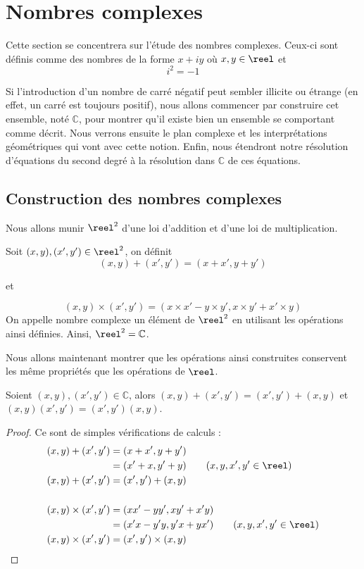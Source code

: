 \section{Nombres complexes}

Cette section se concentrera sur l'étude des nombres complexes. Ceux-ci sont définis comme des nombres de la forme $x+iy$ où $x,y\in\reel$ et $$i^2=-1$$

Si l'introduction d'un nombre de carré négatif peut sembler illicite ou étrange (en effet, un carré est toujours positif), nous allons commencer par construire cet ensemble, noté $\mathbb C$, pour montrer qu'il existe bien un ensemble se comportant comme décrit. Nous verrons ensuite le plan complexe et les interprétations géométriques qui vont avec cette notion. Enfin, nous étendront notre résolution d'équations du second degré à la résolution dans $\mathbb C$ de ces équations.

\subsection{Construction des nombres complexes}

Nous allons munir $\reel^2$ d'une loi d'addition et d'une loi de multiplication.

\begin{defi}
    Soit $(x,y),(x',y')\in\reel^2$, on définit $$(x,y)+(x',y')=(x+x',y+y')$$ \begin{center} et\end{center} $$(x,y)\times (x',y')=(x\times x'-y\times y',x\times y'+x'\times y)$$ On appelle nombre complexe un élément de $\reel^2$ en utilisant les opérations ainsi définies. Ainsi, $\reel^2=\mathbb C$.
\end{defi}

Nous allons maintenant montrer que les opérations ainsi construites conservent les même propriétés que les opérations de $\reel$.

\begin{prop}[Commutativité]
    Soient $(x,y),(x',y')\in\mathbb C$, alors $(x,y)+(x',y')=(x',y')+(x,y)$ et $(x,y)(x',y')=(x',y')(x,y)$.
\end{prop}
\begin{proof}
    Ce sont de simples vérifications de calculs :
    \begin{align*}
        (x,y)+(x',y') &= (x+x',y+y')\\
        &= (x'+x,y'+y) \qquad (x,y,x',y'\in\reel)\\
        (x,y)+(x',y') &= (x',y')+(x,y)\\
        \\
        (x,y)\times (x',y') &= (xx'-yy',xy'+x'y)\\
        &= (x'x-y'y,y'x+yx') \qquad (x,y,x',y'\in\reel)\\
        (x,y)\times (x',y') &= (x',y')\times (x,y)
    \end{align*}
\end{proof}

